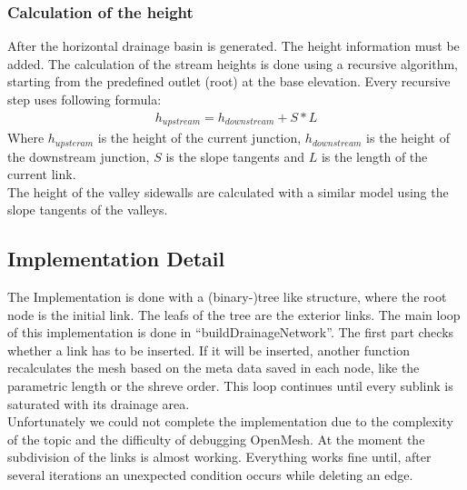 \documentclass[11pt,a4paper]{article}
\begin{document}
\subsubsection{Calculation of the height}
After the horizontal drainage basin is generated. The height information must be added.
The calculation of the stream heights is done using a recursive algorithm, starting from the predefined outlet (root) at the base elevation. 
Every recursive step uses following formula:
\begin{align}
h_{upstream} = h_{downstream} + S * L
\end{align}
Where $h_{upsteram}$ is the height of the current junction, $h_{downstream}$ is the height of the downstream junction, $S$ is the slope tangents and $L$ is the length of the current link.\\
The height of the valley sidewalls are calculated with a similar model using the slope tangents of the valleys. 

\subsection{Implementation Detail}
The Implementation is done with a (binary-)tree like structure, where the root
node is the initial link. The leafs of the tree are the exterior links.
The main loop of this implementation is done in ``buildDrainageNetwork''.
The first part checks whether a link has to be inserted. If it will be inserted,
another function recalculates the mesh based on the meta data saved in each
node, like the parametric length or the shreve order.
This loop continues until every sublink is saturated with its drainage area.\\
Unfortunately we could not complete the implementation due to the complexity of the topic and the difficulty of debugging OpenMesh. At the moment the subdivision of the links is almost working. Everything works fine until, after several iterations an unexpected condition occurs while deleting an edge.

\newpage


\end{document}
